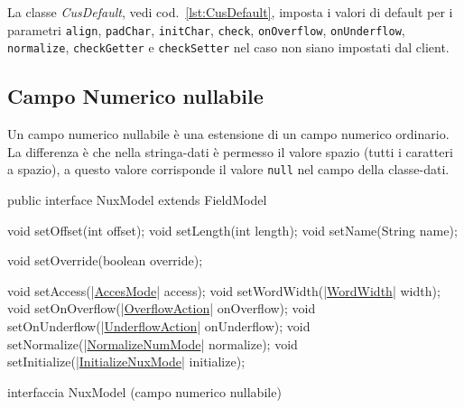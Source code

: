 \documentclass[a4paper,10pt]{report}
\newif\ifesource
\newenvironment{elisting}[1][!htb]
  {\captionsetup{aboveskip=0pt}\begin{listing}[#1]}
  {\end{listing}%
}
\begin{document}
La classe \textsl{CusDefault}, vedi cod.~\ref{lst:CusDefault}, imposta i valori
di default per i parametri \verb!align!, \verb!padChar!, \verb!initChar!, 
\verb!check!, \verb!onOverflow!, \verb!onUnderflow!, \verb!normalize!, 
\verb!checkGetter! e \verb!checkSetter! nel caso non siano  impostati dal 
client.


\subsection{Campo Numerico nullabile}
Un campo numerico nullabile è una estensione di un campo numerico ordinario.
La differenza è che nella stringa-dati è permesso il valore spazio (tutti i
caratteri a spazio), a questo valore corrisponde il valore \verb!null! nel 
campo della classe-dati.

\ifesource
\begin{figure*}[!htb]
\begin{lstlisting}[language=java, 
caption=interfaccia NuxModel (campo numerico nullabile), 
label=lst:NuxModel]
public interface NuxModel extends FieldModel {
    void setOffset(int offset);
    void setLength(int length);
    void setName(String name);

    void setOverride(boolean override);

    void setAccess((*\hyperref[lst:AccesMode]{AccesMode}*) access);
    void setWordWidth((*\hyperref[lst:WordWidth]{WordWidth}*) width);
    void setOnOverflow((*\hyperref[lst:OverflowAction]{OverflowAction}*) onOverflow);
    void setOnUnderflow((*\hyperref[lst:UnderflowAction]{UnderflowAction}*) onUnderflow);
    void setNormalize((*\hyperref[lst:NormalizeNumMode]{NormalizeNumMode}*) normalize);
    void setInitialize((*\hyperref[lst:InitializeNuxMode]{InitializeNuxMode}*) initialize);
}
\end{lstlisting}\index{NuxModel}
\end{figure*}
\else
\begin{elisting}
\begin{javacode}
public interface NuxModel extends FieldModel {
    void setOffset(int offset);
    void setLength(int length);
    void setName(String name);

    void setOverride(boolean override);

    void setAccess(|\hyperref[lst:AccesMode]{AccesMode}| access);
    void setWordWidth(|\hyperref[lst:WordWidth]{WordWidth}| width);
    void setOnOverflow(|\hyperref[lst:OverflowAction]{OverflowAction}| onOverflow);
    void setOnUnderflow(|\hyperref[lst:UnderflowAction]{UnderflowAction}| onUnderflow);
    void setNormalize(|\hyperref[lst:NormalizeNumMode]{NormalizeNumMode}| normalize);
    void setInitialize(|\hyperref[lst:InitializeNuxMode]{InitializeNuxMode}| initialize);
}
\end{javacode}
\caption{interfaccia NuxModel (campo numerico nullabile)}
\label{lst:NuxModel}
\end{elisting}
\fi
\end{document}
